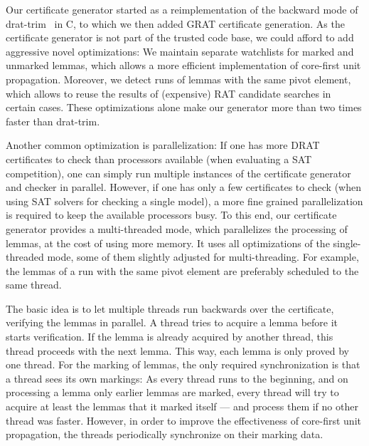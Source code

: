 \documentclass{llncs}
\newcommand\CC{C\nolinebreak[4]\hspace{-.05em}\raisebox{.4ex}{\relsize{-3}{\textbf{++}}}}
\begin{document}
Our certificate generator started as a reimplementation of the backward mode of drat-trim~\cite{WHH13,drat-trim-webpage} in \CC, to 
which we then added GRAT certificate generation. 
As the certificate generator is not part of the trusted code base, we could afford to add aggressive novel optimizations:
We maintain separate watchlists for marked and unmarked lemmas, which allows a more efficient implementation of core-first unit propagation.
Moreover, we detect runs of lemmas with the same pivot element, which allows to reuse the results of (expensive) RAT candidate searches in certain cases.
These optimizations alone make our generator more than two times faster than drat-trim. 

Another common optimization is parallelization: If one has more DRAT certificates to check than processors 
available (\eg when evaluating a SAT competition), one can simply run multiple instances of the certificate generator and checker in parallel.
However, if one has only a few certificates to check (\eg when using SAT solvers for checking a single model), a more fine grained parallelization 
is required to keep the available processors busy. 
To this end, our certificate generator provides a multi-threaded mode,
which parallelizes the processing of lemmas, at the cost of using more memory. 
It uses all optimizations of the single-threaded mode, some of them slightly adjusted for multi-threading. 
For example, the lemmas of a run with the same pivot element are preferably scheduled to the same thread.

The basic idea is to let multiple threads run backwards over the certificate, verifying the lemmas in parallel.
A thread tries to acquire a lemma before it starts verification. If the lemma is already acquired 
by another thread, this thread proceeds with the next lemma. This way, each lemma is only proved by one thread.
For the marking of lemmas, the only required synchronization is that a thread sees its own markings: As every thread runs to the beginning, 
and on processing a lemma only earlier lemmas are marked, every thread will try to acquire at least the lemmas that it marked itself --- and 
process them if no other thread was faster. 
However, in order to improve the effectiveness of core-first unit propagation, the threads periodically synchronize on their marking data.
\end{document}
